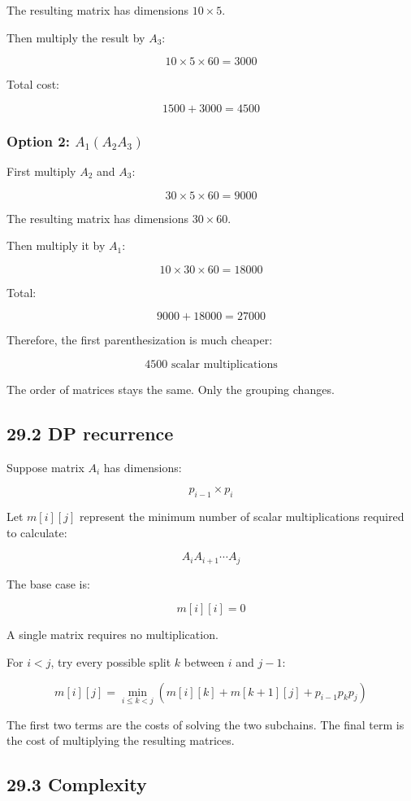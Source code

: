 The resulting matrix has dimensions $10\times5$.

Then multiply the result by $A_3$:


\[
10\times5\times60=3000
\]


Total cost:


\[
1500+3000=\boxed{4500}
\]


\subsubsection{\textbf{Option 2: }$A_1(A_2A_3)$}

First multiply $A_2$ and $A_3$:


\[
30\times5\times60=9000
\]


The resulting matrix has dimensions $30\times60$.

Then multiply it by $A_1$:


\[
10\times30\times60=18000
\]


Total:


\[
9000+18000=\boxed{27000}
\]


Therefore, the first parenthesization is much cheaper:


\[
\boxed{4500\text{ scalar multiplications}}
\]


The order of matrices stays the same. Only the grouping changes.

\subsection{29.2 DP recurrence}

Suppose matrix $A_i$ has dimensions:


\[
p_{i-1}\times p_i
\]


Let $m[i][j]$ represent the minimum number of scalar multiplications required to calculate:


\[
A_iA_{i+1}\cdots A_j
\]


The base case is:


\[
m[i][i]=0
\]


A single matrix requires no multiplication.

For $i<j$, try every possible split $k$ between $i$ and $j-1$:


\[
\boxed{ m[i][j]= \min_{i\leq k<j} \left( m[i][k]+m[k+1][j]+p_{i-1}p_kp_j \right) }
\]


The first two terms are the costs of solving the two subchains. The final term is the cost of multiplying the resulting matrices.

\subsection{29.3 Complexity}

